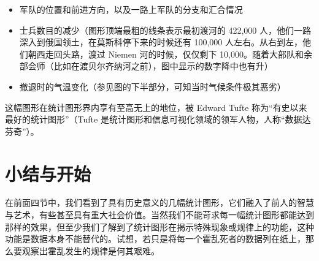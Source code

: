 \documentclass[
  b5paper,
  UTF8,twoside]{book}
\providecommand{\tightlist}{%
  \setlength{\itemsep}{0pt}\setlength{\parskip}{0pt}}
\begin{document}
\begin{itemize}
\tightlist
\item
  军队的位置和前进方向，以及一路上军队的分支和汇合情况
\item
  士兵数目的减少（图形顶端最粗的线条表示最初渡河的 422,000 人，他们一路深入到俄国领土，在莫斯科停下来的时候还有 100,000 人左右。从右到左，他们朝西走回头路，渡过 Niemen 河的时候，仅仅剩下 10,000。随着大部队和余部会师（比如在渡贝尔齐纳河之前），图中显示的数字降中也有升）
\item
  撤退时的气温变化（参见图的下半部分，可知当时气候条件极其恶劣）
\end{itemize}

这幅图形在统计图形界内享有至高无上的地位，被 Edward Tufte 称为``有史以来最好的统计图形''（Tufte 是统计图形和信息可视化领域的领军人物，人称``数据达芬奇''）。

\hypertarget{sec:begin}{%
\section{小结与开始}\label{sec:begin}}

在前面四节中，我们看到了具有历史意义的几幅统计图形，它们融入了前人的智慧与艺术，有些甚至具有重大社会价值。当然我们不能苛求每一幅统计图形都能达到那样的效果，但至少我们了解到了统计图形在揭示特殊现象或规律上的功能，这种功能是数据本身不能替代的。试想，若只是将每一个霍乱死者的数据列在纸上，那么要观察出霍乱发生的规律是何其艰难。
\end{document}

